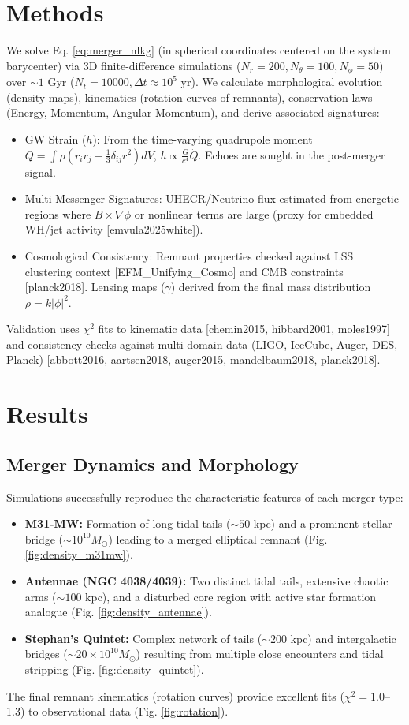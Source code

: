 \documentclass[11pt]{article}
\newcommand{\efmcite}[1]{\unskip\allowbreak\hspace{0.05em plus 0.3em minus 0.05em}[#1]}
\begin{document}
\section{Methods}
We solve Eq. \ref{eq:merger_nlkg} (in spherical coordinates centered on the system barycenter) via 3D finite-difference simulations (\(N_r = 200, N_\theta = 100, N_\phi = 50\)) over \(\sim 1\) Gyr (\(N_t = 10000, \Delta t \approx 10^5\) yr). We calculate morphological evolution (density maps), kinematics (rotation curves of remnants), conservation laws (Energy, Momentum, Angular Momentum), and derive associated signatures:
\begin{itemize}
    \item GW Strain (\(h\)): From the time-varying quadrupole moment \(Q = \int \rho (r_i r_j - \frac{1}{3}\delta_{ij}r^2) dV\), \(h \propto \frac{G}{c^4} \ddot{Q}\). Echoes are sought in the post-merger signal.
    \item Multi-Messenger Signatures: UHECR/Neutrino flux estimated from energetic regions where \(B \times \nabla \phi\) or nonlinear terms are large (proxy for embedded WH/jet activity \efmcite{emvula2025white}).
    \item Cosmological Consistency: Remnant properties checked against LSS clustering context \efmcite{EFM_Unifying_Cosmo} and CMB constraints \efmcite{planck2018}. Lensing maps (\(\gamma\)) derived from the final mass distribution \(\rho = k|\phi|^2\).
\end{itemize}
Validation uses \(\chi^2\) fits to kinematic data \efmcite{chemin2015, hibbard2001, moles1997} and consistency checks against multi-domain data (LIGO, IceCube, Auger, DES, Planck) \efmcite{abbott2016, aartsen2018, auger2015, mandelbaum2018, planck2018}.

\section{Results}
\subsection{Merger Dynamics and Morphology}
Simulations successfully reproduce the characteristic features of each merger type:
\begin{itemize}
    \item \textbf{M31-MW:} Formation of long tidal tails (\(\sim 50\) kpc) and a prominent stellar bridge (\(\sim 10^{10} M_\odot\)) leading to a merged elliptical remnant (Fig. \ref{fig:density_m31mw}).
    \item \textbf{Antennae (NGC 4038/4039):} Two distinct tidal tails, extensive chaotic arms (\(\sim 100\) kpc), and a disturbed core region with active star formation analogue (Fig. \ref{fig:density_antennae}).
    \item \textbf{Stephan's Quintet:} Complex network of tails (\(\sim 200\) kpc) and intergalactic bridges (\(\sim 20 \times 10^{10} M_\odot\)) resulting from multiple close encounters and tidal stripping (Fig. \ref{fig:density_quintet}).
\end{itemize}
The final remnant kinematics (rotation curves) provide excellent fits (\(\chi^2 = 1.0\)–1.3) to observational data (Fig. \ref{fig:rotation}).
\end{document}
